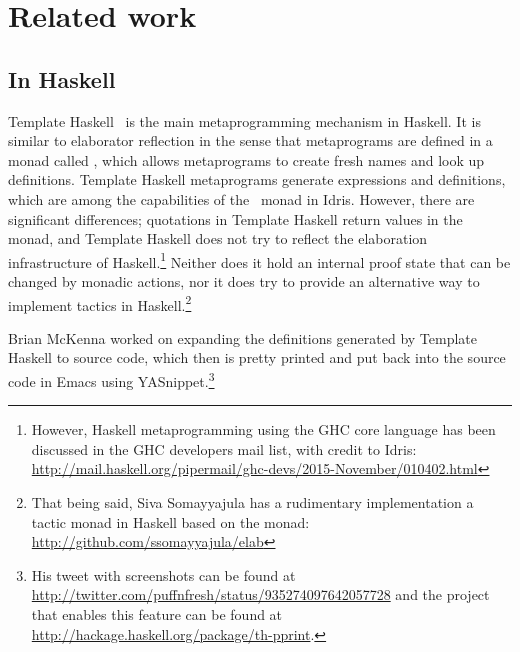 \section{Related work} \label{chap:relatedwork}

\subsection{In Haskell}

Template Haskell~\cite{th} is the main metaprogramming mechanism in Haskell.
It is similar to elaborator reflection in the sense that metaprograms are
defined in a monad called , which allows metaprograms to create fresh
names and look up definitions.
Template Haskell metaprograms generate expressions and definitions, which are
among the capabilities of the \Elab\ monad in Idris.
However, there are significant differences;
quotations in Template Haskell return values in the  monad, and Template
Haskell does not try to reflect the elaboration infrastructure of
Haskell.\footnote{However, Haskell metaprogramming using the GHC core language
has been discussed in the GHC developers mail list, with credit to Idris:
\url{http://mail.haskell.org/pipermail/ghc-devs/2015-November/010402.html}}
Neither does it hold an internal proof state that can be changed by monadic
actions, nor it does try to provide an alternative way to implement tactics in
Haskell.\footnote{That being said, Siva Somayyajula has a rudimentary
implementation a tactic monad in Haskell based on the  monad:
\url{http://github.com/ssomayyajula/elab}}

Brian McKenna worked on expanding the definitions generated by Template Haskell
to source code, which then is pretty printed and put back into the source code
in Emacs using YASnippet.\footnote{His tweet with screenshots can be found at
\url{http://twitter.com/puffnfresh/status/935274097642057728} and the project
that enables this feature can be found at
\url{http://hackage.haskell.org/package/th-pprint}.}


